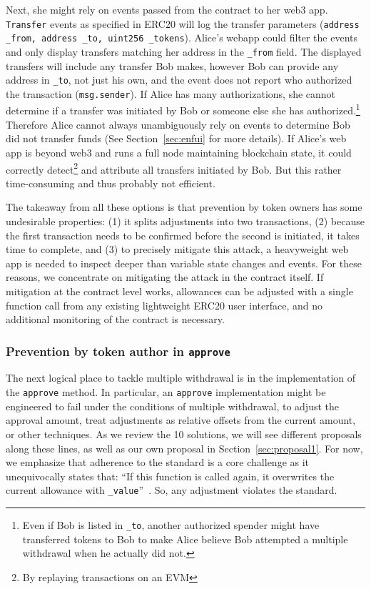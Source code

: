 Next, she might rely on events passed from the contract to her web3 app. \texttt{Transfer} events as specified in ERC20 will log the transfer parameters (\ie  \texttt{address \_from, address \_to, uint256 \_tokens}). Alice's webapp could filter the events and only display transfers matching her address in the \texttt{\_from} field. The displayed transfers will include any transfer Bob makes, however Bob can provide any address in \texttt{\_to}, not just his own, and the event does not report who authorized the transaction (\ie \texttt{msg.sender}). If Alice has many authorizations, she cannot determine if a transfer was initiated by Bob or someone else she has authorized.\footnote{Even if Bob is listed in \texttt{\_to}, another authorized spender might have transferred tokens to Bob to make Alice believe Bob attempted a multiple withdrawal when he actually did not.} Therefore Alice cannot always unambiguously rely on events to determine Bob did not transfer funds (See Section~\ref{sec:enfui} for more details). If Alice's web app is beyond web3 and runs a full node maintaining blockchain state, it could correctly detect\footnote{By replaying transactions on an EVM} and attribute all transfers initiated by Bob. But this rather time-consuming and thus probably not efficient.

The takeaway from all these options is that prevention by token owners has some undesirable properties: (1) it splits adjustments into two transactions, (2) because the first transaction needs to be confirmed before the second is initiated, it takes time to complete, and (3) to precisely mitigate this attack, a heavyweight web app is needed to inspect deeper than variable state changes and events. For these reasons, we concentrate on mitigating the attack in the contract itself. If mitigation at the contract level works, allowances can be adjusted with a single function call from any existing lightweight ERC20 user interface, and no additional monitoring of the contract is necessary. 

	
\subsubsection*{Prevention by token author in \texttt{approve}} The next logical place to tackle multiple withdrawal is in the implementation of the \texttt{approve} method. In particular, an \texttt{approve} implementation might be engineered to fail under the conditions of multiple withdrawal, to adjust the approval amount, treat adjustments as relative offsets from the current amount, or other techniques. As we review the 10 solutions, we will see different proposals along these lines, as well as our own proposal in Section~\ref{sec:proposal1}. For now, we emphasize that adherence to the standard is a core challenge as it unequivocally states that: ``If this function is called again, it overwrites the current allowance with \texttt{\_value}''~\cite{Ref08}. So, any adjustment violates the standard.


